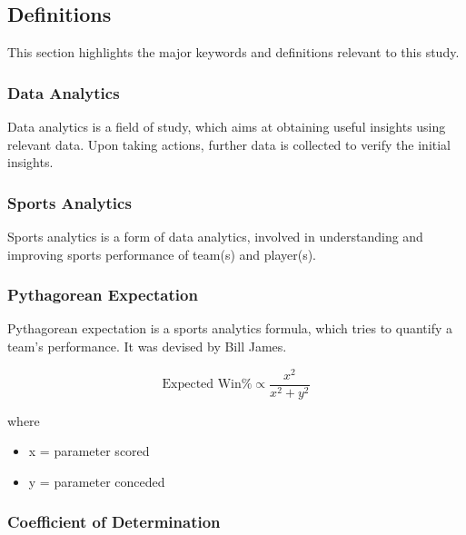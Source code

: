 \documentclass[
  english,
  doc,floatsintext]{apa6}
\providecommand{\tightlist}{%
  \setlength{\itemsep}{0pt}\setlength{\parskip}{0pt}}
\begin{document}
\hypertarget{definitions}{%
\subsection{Definitions}\label{definitions}}

This section highlights the major keywords and definitions relevant to this study.

\hypertarget{data-analytics}{%
\subsubsection{Data Analytics}\label{data-analytics}}

Data analytics is a field of study, which aims at obtaining useful insights using relevant data. Upon taking actions, further data is collected to verify the initial insights.

\hypertarget{sports-analytics}{%
\subsubsection{Sports Analytics}\label{sports-analytics}}

Sports analytics is a form of data analytics, involved in understanding and improving sports performance of team(s) and player(s).

\hypertarget{pythagorean-expectation}{%
\subsubsection{Pythagorean Expectation}\label{pythagorean-expectation}}

Pythagorean expectation is a sports analytics formula, which tries to quantify a team's performance. It was devised by Bill James.

\[
\text{Expected Win\%} \propto\frac{x^2}{x^2 + y^2}
\]

where

\begin{itemize}
\tightlist
\item
  x = parameter scored
\item
  y = parameter conceded
\end{itemize}

\hypertarget{coefficient-of-determination}{%
\subsubsection{Coefficient of Determination}\label{coefficient-of-determination}}
\end{document}

